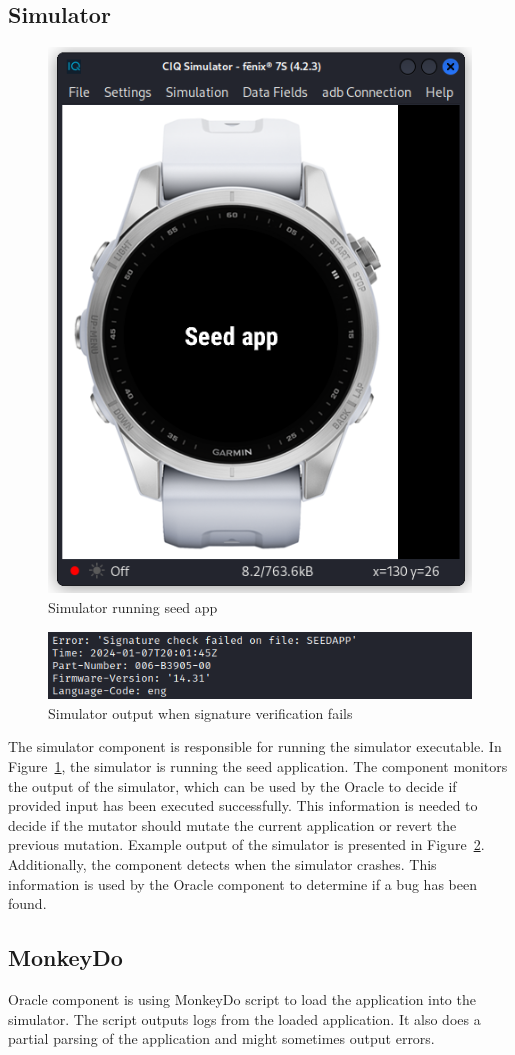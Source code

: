\subsection*{Simulator}
    \begin{figure}[b]
        \centering
        \includegraphics[width=0.39\linewidth]{../../images/simulator-seed-app}
        \caption{Simulator running seed app}
        \label{fig:simulator-seed-app}
    \end{figure}
    \begin{figure}
        \centering
        \includegraphics[width=0.6\linewidth]{../../images/simulator-signature-failed}
        \caption{Simulator output when signature verification fails}
        \label{fig:simulator-signature-failed}
    \end{figure}
The simulator component is responsible for running the simulator executable.
In Figure~\ref{fig:simulator-seed-app}, the simulator is running the seed application.
The component monitors the output of the simulator, which can be used by the Oracle to decide if provided input has been executed successfully.
This information is needed to decide if the mutator should mutate the current application or revert the previous mutation.
Example output of the simulator is presented in Figure~\ref{fig:simulator-signature-failed}.
Additionally, the component detects when the simulator crashes.
This information is used by the Oracle component to determine if a bug has been found.

\subsection*{MonkeyDo}
Oracle component is using MonkeyDo script to load the application into the simulator.
The script outputs logs from the loaded application.
It also does a partial parsing of the application and might sometimes output errors.


